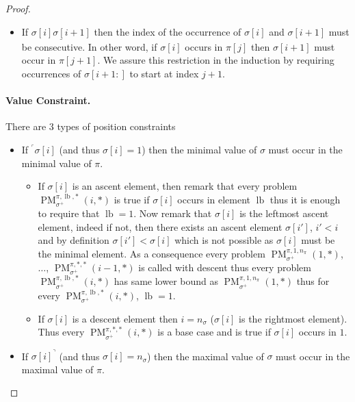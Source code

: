 \documentclass[a4paper]{llncs}
\newcommand{\ptext}{\pi}
\newcommand{\pmotif}{\sigma}
\newcommand{\pbmotif}{\pmotif^+}
\DeclareMathOperator{\PMa}{PM}
\newcommand{\PM}[6]{\PMa_{{#1}}^{{#2},{#3},{#4}}({#5},{#6})}
\DeclareMathOperator{\lb}{lb}
\begin{document}
\begin{proof}
\begin{itemize}
	\item If $\underline{\pmotif[i]\pmotif[i+1]}$ then the index of the occurrence of $\pmotif[i]$ and $\pmotif[i+1]$ must be consecutive. In other word, if $\pmotif[i]$ occurs in $\ptext[j]$ then $\pmotif[i+1]$ must occur in $\ptext[j+1]$. We assure this restriction in the induction by requiring occurrences of $\pmotif[i+1:]$ to start at index $j+1$.
\end{itemize}

\paragraph{Value Constraint.} There are 3 types of position constraints
\begin{itemize}
	\item If $^\ulcorner{\sigma[i]}$ (and thus $\sigma[i]=1$) then the minimal value of $\pmotif$ must occur in the minimal value of $\ptext$.
	\begin{itemize}

		\item If $\sigma[i]$ is an ascent element, then remark that 
		every problem 
		$\PM{\pbmotif}{\ptext}{\lb}{*}{i}{*}$ is true if $\sigma[i]$ occurs in element $\lb$ thus it is enough to require that $\lb=1$.
		Now remark that $\sigma[i]$ is the leftmost ascent element, indeed if not, then there exists an ascent element $\sigma[i']$, $i'<i$ and by definition $\sigma[i']<\sigma[i]$ which is not possible as $\sigma[i]$ must be the minimal element. As a consequence every problem $\PM{\pbmotif}{\ptext}{1}{n_{\pi}}{1}{*}$, $\dots$, $\PM{\pbmotif}{\ptext}{*}{*}{i-1}{*}$ is called with descent thus every problem 
		$\PM{\pbmotif}{\ptext}{\lb}{*}{i}{*}$ has same lower bound as $\PM{\pbmotif}{\ptext}{1}{n_{\ptext}}{1}{*}$ thus for every $\PM{\pbmotif}{\ptext}{\lb}{*}{i}{*}$, $\lb=1$.
					
		\item If $\sigma[i]$ is a descent element then $i=n_\pmotif$ ($\sigma[i]$ is the rightmost element). Thus every $\PM{\pbmotif}{\ptext}{*}{*}{i}{*}$ is a base case and is true if $\sigma[i]$ occurs in $1$.
	\end{itemize}

	\item If ${\pmotif[i]}^\urcorner$ (and thus $\sigma[i]=n_\pmotif$) 
	then the maximal value of $\pmotif$ must occur in the maximal value of $\ptext$.
	\begin{itemize}


\end{itemize}
\end{itemize}
\end{proof}
\end{document}
